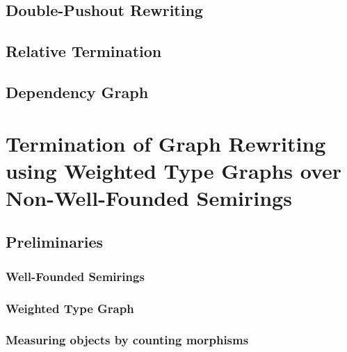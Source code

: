 \documentclass{report}
\begin{document}
\section{Double-Pushout Rewriting} 
\label{sec:dpo}
 
\section{Relative Termination} 
\label{sec:relative_termination}

\section{Dependency Graph}


\chapter{Termination of Graph Rewriting using Weighted Type Graphs over Non-Well-Founded Semirings} 
\label{chap:nwf}



\section{Preliminaries}

\subsection{Well-Founded Semirings} 
\label{sec:well_founded_semiring}

 
\subsection{Weighted Type Graph} 
\label{sec:weighted_type_graph}


\subsection{Measuring objects by counting morphisms}
\label{sec:type_graph:wf:measuring_graphs}

  
\end{document}
